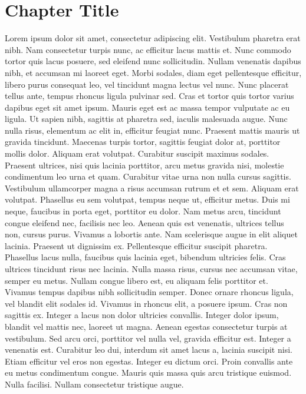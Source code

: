\documentclass[a4paper]{memoir}
\begin{document}
\chapter{Chapter Title}
\label{chaptertitle}

Lorem ipsum dolor sit amet, consectetur adipiscing elit. Vestibulum pharetra erat nibh. Nam consectetur turpis nunc, ac efficitur lacus mattis et. Nunc commodo tortor quis lacus posuere, sed eleifend nunc sollicitudin. Nullam venenatis dapibus nibh, et accumsan mi laoreet eget. Morbi sodales, diam eget pellentesque efficitur, libero purus consequat leo, vel tincidunt magna lectus vel nunc. Nunc placerat tellus ante, tempus rhoncus ligula pulvinar sed. Cras et tortor quis tortor varius dapibus eget sit amet ipsum. Mauris eget est ac massa tempor vulputate ac eu ligula.
Ut sapien nibh, sagittis at pharetra sed, iaculis malesuada augue. Nunc nulla risus, elementum ac elit in, efficitur feugiat nunc. Praesent mattis mauris ut gravida tincidunt. Maecenas turpis tortor, sagittis feugiat dolor at, porttitor mollis dolor. Aliquam erat volutpat. Curabitur suscipit maximus sodales. Praesent ultrices, nisi quis lacinia porttitor, arcu metus gravida nisi, molestie condimentum leo urna et quam.
Curabitur vitae urna non nulla cursus sagittis. Vestibulum ullamcorper magna a risus accumsan rutrum et et sem. Aliquam erat volutpat. Phasellus eu sem volutpat, tempus neque ut, efficitur metus. Duis mi neque, faucibus in porta eget, porttitor eu dolor. Nam metus arcu, tincidunt congue eleifend nec, facilisis nec leo. Aenean quis est venenatis, ultrices tellus non, cursus purus. Vivamus a lobortis ante. Nam scelerisque augue in elit aliquet lacinia. Praesent ut dignissim ex. Pellentesque efficitur suscipit pharetra. Phasellus lacus nulla, faucibus quis lacinia eget, bibendum ultricies felis. Cras ultrices tincidunt risus nec lacinia. Nulla massa risus, cursus nec accumsan vitae, semper eu metus. Nullam congue libero est, eu aliquam felis porttitor et. Vivamus tempus dapibus nibh sollicitudin semper.
Donec ornare rhoncus ligula, vel blandit elit sodales id. Vivamus in rhoncus elit, a posuere ipsum. Cras non sagittis ex. Integer a lacus non dolor ultricies convallis. Integer dolor ipsum, blandit vel mattis nec, laoreet ut magna. Aenean egestas consectetur turpis at vestibulum. Sed arcu orci, porttitor vel nulla vel, gravida efficitur est. Integer a venenatis est. Curabitur leo dui, interdum sit amet lacus a, lacinia suscipit nisi. Etiam efficitur vel eros non egestas. Integer eu dictum orci. Proin convallis ante eu metus condimentum congue. Mauris quis massa quis arcu tristique euismod. Nulla facilisi. Nullam consectetur tristique augue.
\end{document}
